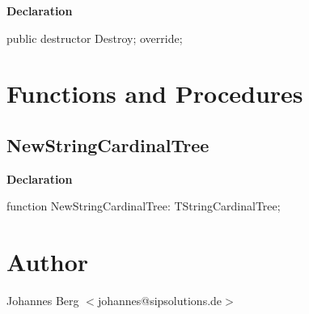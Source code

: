 \documentclass{report}
\newif\ifpdf
\begin{document}
\label{PasDoc_HierarchyTree.TStringCardinalTree-Destroy}
\begin{list}{}{
\setlength{\itemindent}{0cm}
\setlength{\listparindent}{0cm}
\setlength{\leftmargin}{\evensidemargin}
\addtolength{\leftmargin}{\tmplength}
\settowidth{\labelsep}{X}
\addtolength{\leftmargin}{\labelsep}
\setlength{\labelwidth}{\tmplength}
}
\item[\textbf{Declaration}\hfill]
\ifpdf
\begin{flushleft}
\fi
\begin{ttfamily}
public destructor Destroy; override;\end{ttfamily}

\ifpdf
\end{flushleft}
\fi

\end{list}
\section{Functions and Procedures}
\ifpdf
\subsection*{\large{\textbf{NewStringCardinalTree}}\normalsize\hspace{1ex}\hrulefill}
\else
\subsection*{NewStringCardinalTree}
\fi
\label{PasDoc_HierarchyTree-NewStringCardinalTree}
\begin{list}{}{
\setlength{\itemindent}{0cm}
\setlength{\listparindent}{0cm}
\setlength{\leftmargin}{\evensidemargin}
\addtolength{\leftmargin}{\tmplength}
\settowidth{\labelsep}{X}
\addtolength{\leftmargin}{\labelsep}
\setlength{\labelwidth}{\tmplength}
}
\item[\textbf{Declaration}\hfill]
\ifpdf
\begin{flushleft}
\fi
\begin{ttfamily}
function NewStringCardinalTree: TStringCardinalTree;\end{ttfamily}

\ifpdf
\end{flushleft}
\fi

\end{list}
\section{Author}
\par
Johannes Berg {$<$}johannes@sipsolutions.de{$>$}
\end{document}

